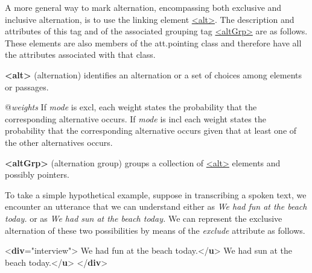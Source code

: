 \par
A more general way to mark alternation, encompassing both exclusive and inclusive alternation, is to use the linking element \hyperref[TEI.alt]{<alt>}. The description and attributes of this tag and of the associated grouping tag \hyperref[TEI.altGrp]{<altGrp>} are as follows. These elements are also members of the \textsf{att.pointing} class and therefore have all the attributes associated with that class. 
\begin{sansreflist}
  
\item [\textbf{<alt>}] (alternation) identifies an alternation or a set of choices among elements or passages.\hfil\\[-10pt]\begin{sansreflist}
    \item[@{\itshape weights}]
  If {\itshape mode} is excl, each weight states the probability that the corresponding alternative occurs. If {\itshape mode} is incl each weight states the probability that the corresponding alternative occurs given that at least one of the other alternatives occurs.
\end{sansreflist}  
\item [\textbf{<altGrp>}] (alternation group) groups a collection of \hyperref[TEI.alt]{<alt>} elements and possibly pointers.
\end{sansreflist}
\par
To take a simple hypothetical example, suppose in transcribing a spoken text, we encounter an utterance that we can understand either as \textit{We had fun at the beach today.} or as \textit{We had sun at the beach today.} We can represent the exclusive alternation of these two possibilities by means of the {\itshape exclude} attribute as follows. \par\bgroup{}\exampleFont \begin{shaded}\noindent\mbox{}{<\textbf{div}\hspace*{1em}{type}="{interview}">}\mbox{}\newline 
{}We had fun at the beach today.{</\textbf{u}>}\mbox{}\newline 
{}We had sun at the beach today.{</\textbf{u}>}\mbox{}\newline 
{</\textbf{div}>}\end{shaded}\egroup\par \par
